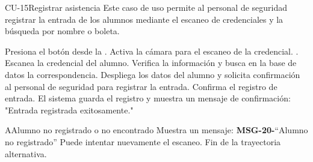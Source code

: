 \begin{UseCase}{CU-15}{Registrar asistencia}{
		Este caso de uso permite al personal de seguridad registrar la entrada de los alumnos mediante el escaneo de credenciales y la búsqueda por nombre o boleta.
	}
\end{UseCase}
\begin{UCtrayectoria}
	\UCpaso[\UCactor] Presiona el botón  desde la .
	\UCpaso Activa la cámara para el escaneo de la credencial. .
	\UCpaso[\UCactor] Escanea la credencial del alumno.
	\UCpaso Verifica la información y busca en la base de datos la correspondencia.  
	\UCpaso Despliega los datos del alumno y solicita confirmación al personal de seguridad para registrar la entrada.
	\UCpaso[\UCactor] Confirma el registro de entrada.
	\UCpaso El sistema guarda el registro y muestra un mensaje de confirmación: "Entrada registrada exitosamente."
\end{UCtrayectoria}
\begin{UCtrayectoriaA}{A}{Alumno no registrado o no encontrado}
	\UCpaso Muestra un mensaje: {\bf MSG-20-}{``Alumno no registrado''}
	\UCpaso[\UCactor] Puede intentar nuevamente el escaneo.
	\UCpaso Fin de la trayectoria alternativa.
\end{UCtrayectoriaA}
